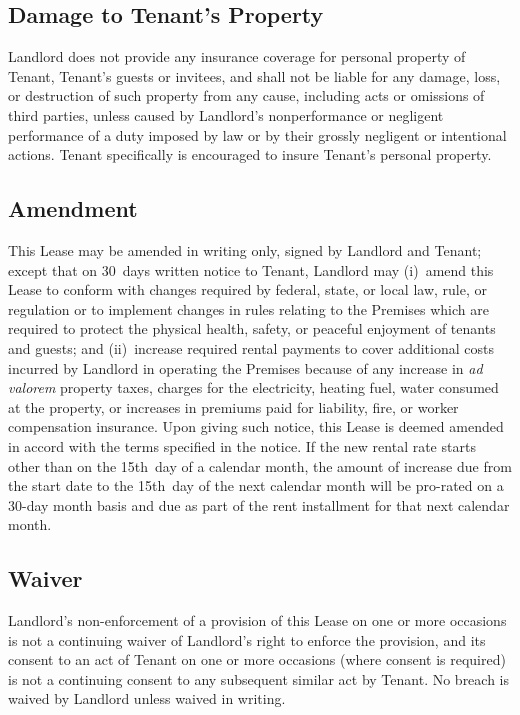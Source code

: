 \documentclass{article}
\begin{document}
\subsection{Damage to Tenant’s Property}
Landlord does not provide any insurance coverage for personal property of
Tenant, Tenant’s guests or invitees, and shall not be liable for any damage,
loss, or destruction of such property from any cause, including acts or
omissions of third parties, unless caused by Landlord’s nonperformance or
negligent performance of a duty imposed by law or by their grossly negligent or
intentional actions. Tenant specifically is encouraged to insure Tenant’s
personal property.

\subsection{Amendment}
This Lease may be amended in writing only, signed by Landlord and Tenant; except
that on 30~days written notice to Tenant, Landlord may (i)~amend this Lease to
conform with changes required by federal, state, or local law, rule, or
regulation or to implement changes in rules relating to the Premises which are
required to protect the physical health, safety, or peaceful enjoyment of
tenants and guests; and (ii)~increase required rental payments to cover
additional costs incurred by Landlord in operating the Premises because of any
increase in \textit{ad valorem} property taxes, charges for the electricity,
heating fuel, water consumed at the property, or increases in premiums paid for
liability, fire, or worker compensation insurance. Upon giving such notice, this
Lease is deemed amended in accord with the terms specified in the notice. If the
new rental rate starts other than on the 15th~day of a calendar month, the
amount of increase due from the start date to the 15th~day of the next calendar
month will be pro-rated on a 30-day month basis and due as part of the rent
installment for that next calendar month.

\subsection{Waiver}
Landlord’s non-enforcement of a provision of this Lease on one or more occasions
is not a continuing waiver of Landlord’s right to enforce the provision, and its
consent to an act of Tenant on one or more occasions (where consent is required)
is not a continuing consent to any subsequent similar act by Tenant. No breach
is waived by Landlord unless waived in writing.
\end{document}
